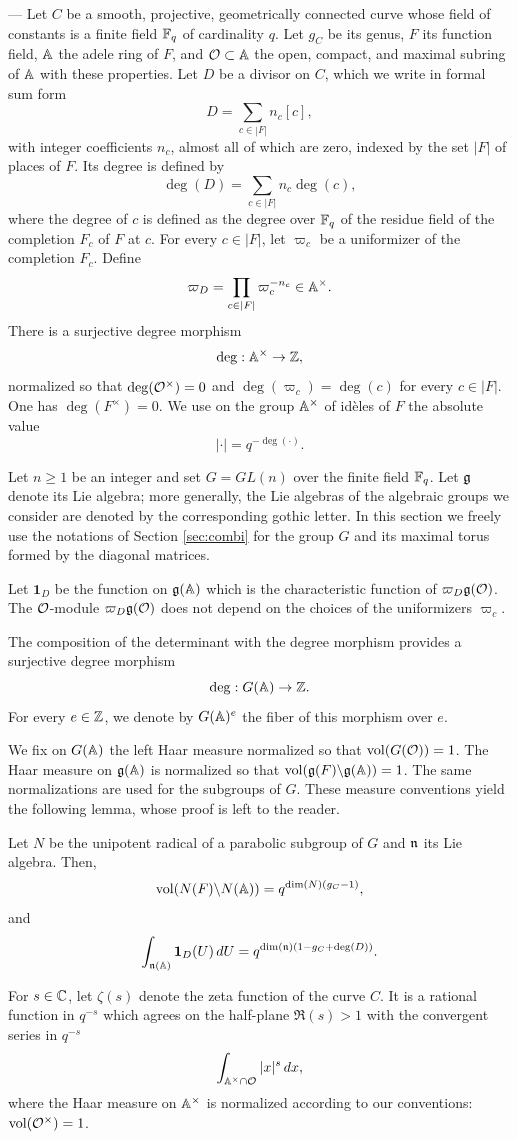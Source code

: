 \begin{paragr} ---\label{S:calculI-adeles}
Let $C$ be a smooth, projective, geometrically connected curve whose field of constants is a finite field $\mathbb{F}_q$ of cardinality $q$. Let $g_C$ be its genus, $F$ its function field, $\mathbb{A}$ the adele ring of $F$, and $\mathcal{O}\subset \mathbb{A}$ the open, compact, and maximal subring of $\mathbb{A}$ with these properties. Let $D$ be a divisor on $C$, which we write in formal sum form
$$D=\sum_{c\in |F|} n_c [c],$$
with integer coefficients $n_c$, almost all of which are zero, indexed by the set $|F|$ of places of $F$. Its degree is defined by
$$\deg(D)=\sum_{c\in |F|} n_c \deg(c),$$
where the degree of $c$ is defined as the degree over $\mathbb{F}_q$ of the residue field of the completion $F_c$ of $F$ at $c$. For every $c \in |F|$, let $\varpi_c$ be a uniformizer of the completion $F_c$. Define
$$\varpi_D=\prod_{c\in |F|}\varpi_c^{-n_c} \in \mathbb{A}^\times.$$
There is a surjective degree morphism
$$\deg :\mathbb{A}^\times \to \mathbb{Z},$$
normalized so that $\deg(\mathcal{O}^\times)=0$ and $\deg(\varpi_c)=\deg(c)$ for every $c\in |F|$. One has $\deg(F^\times)=0$. We use on the group $\mathbb{A}^\times$ of id\`{e}les of $F$ the absolute value
$$|\cdot|=q^{-\deg(\cdot)}.$$

Let $n\geq 1$ be an integer and set $G=GL(n)$ over the finite field $\mathbb{F}_q$. Let $\mathfrak{g}$ denote its Lie algebra; more generally, the Lie algebras of the algebraic groups we consider are denoted by the corresponding gothic letter. In this section we freely use the notations of Section \ref{sec:combi} for the group $G$ and its maximal torus formed by the diagonal matrices.

Let $\mathbf{1}_D$ be the function on $\mathfrak{g}(\mathbb{A})$ which is the characteristic function of $\varpi_D\mathfrak{g}(\mathcal{O})$. The $\mathcal{O}$-module $\varpi_D\mathfrak{g}(\mathcal{O})$ does not depend on the choices of the uniformizers $\varpi_c$.

The composition of the determinant with the degree morphism provides a surjective degree morphism
$$\deg : G(\mathbb{A})\to \mathbb{Z}.$$
For every $e\in \mathbb{Z}$, we denote by $G(\mathbb{A})^e$ the fiber of this morphism over $e$.

We fix on $G(\mathbb{A})$ the left Haar measure normalized so that $\operatorname{vol}(G(\mathcal{O}))=1$. The Haar measure on $\mathfrak{g}(\mathbb{A})$ is normalized so that $\operatorname{vol}(\mathfrak{g}(F)\backslash \mathfrak{g}(\mathbb{A}))=1$. The same normalizations are used for the subgroups of $G$. These measure conventions yield the following lemma, whose proof is left to the reader.

\begin{lemme}
Let $N$ be the unipotent radical of a parabolic subgroup of $G$ and $\mathfrak{n}$ its Lie algebra. Then,
$$\operatorname{vol}(N(F)\backslash N(\mathbb{A}))= q^{\dim(N)(g_C-1)},$$
and
$$\int_{\mathfrak{n}(\mathbb{A})}\mathbf{1}_D(U) \, dU=q^{\dim(\mathfrak{n})(1-g_C+\deg(D))}.$$
\end{lemme}

For $s\in \mathbb{C}$, let $\zeta(s)$ denote the zeta function of the curve $C$. It is a rational function in $q^{-s}$ which agrees on the half-plane $\Re(s)>1$ with the convergent series in $q^{-s}$
$$\int_{\mathbb{A}^\times \cap \mathcal{O}} |x|^s \, dx,$$
where the Haar measure on $\mathbb{A}^\times$ is normalized according to our conventions: $\operatorname{vol}(\mathcal{O}^\times)=1$.
\end{paragr}

